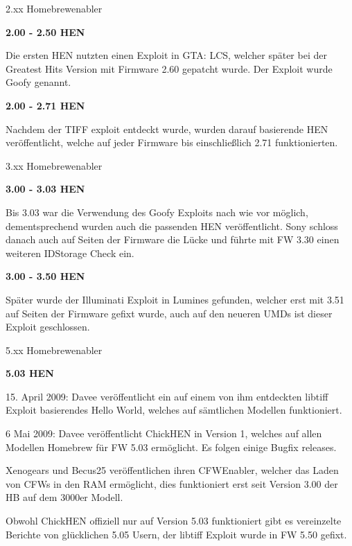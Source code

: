 \documentclass[mode=print,paper=screen,style=jefka]{powerdot}
\newcommand{\Anf}[1]{\glqq #1\grqq}
\begin{document}
\begin{slide}{2.xx Homebrewenabler}
	\begin{large}\textbf{2.00 - 2.50 HEN}\end{large}\linebreak
	Die ersten HEN nutzten einen Exploit in GTA: LCS, welcher später bei der \Anf{Greatest Hits} Version mit Firmware 2.60
	gepatcht wurde. Der Exploit wurde \Anf{Goofy} genannt.\linebreak
	\linebreak
	\begin{large}\textbf{2.00 - 2.71 HEN}\end{large}\linebreak
	Nachdem der TIFF exploit entdeckt wurde, wurden darauf basierende HEN veröffentlicht, welche auf jeder Firmware bis
	einschließlich 2.71 funktionierten.	
\end{slide}

\begin{slide}{3.xx Homebrewenabler}
	\begin{large}\textbf{3.00 - 3.03 HEN}\end{large}\linebreak
	Bis 3.03 war die Verwendung des Goofy Exploits nach wie vor möglich, dementsprechend wurden auch die passenden HEN
	veröffentlicht. Sony schloss danach auch auf Seiten der Firmware die Lücke und führte mit FW 3.30 einen weiteren
	IDStorage Check ein.\linebreak
	\linebreak
	\begin{large}\textbf{3.00 - 3.50 HEN}\end{large}\linebreak
	Später wurde der \Anf{Illuminati} Exploit in Lumines gefunden, welcher erst mit 3.51 auf Seiten der Firmware gefixt wurde,
	auch auf den neueren UMDs ist dieser Exploit geschlossen.	
\end{slide}

\begin{slide}{5.xx Homebrewenabler}
	\begin{large}\textbf{5.03 HEN}\end{large}\linebreak
	\begin{list}{-}{}
		\item{15. April 2009: Davee veröffentlicht ein auf einem von ihm entdeckten libtiff Exploit basierendes Hello World, 
			welches auf sämtlichen Modellen funktioniert.}
		\item{6 Mai 2009: Davee veröffentlicht ChickHEN in Version 1, welches auf allen Modellen Homebrew für FW 5.03 
			ermöglicht. Es folgen einige Bugfix releases.}
		\item{Xenogears und Becus25 veröffentlichen ihren CFWEnabler, welcher das Laden von CFWs in den RAM ermöglicht,
			dies funktioniert erst seit Version 3.00 der HB auf dem 3000er Modell.}
		\item{Obwohl ChickHEN offiziell nur auf Version 5.03 funktioniert gibt es vereinzelte Berichte von glücklichen 5.05
			Usern, der libtiff Exploit wurde in FW 5.50 gefixt.} 
	\end{list}	
\end{slide}
\end{document}
